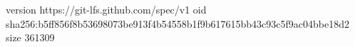 version https://git-lfs.github.com/spec/v1
oid sha256:b5ff856f8b53698073be913f4b54558b1f9b617615bb43c93c5f9ac04bbe18d2
size 361309
